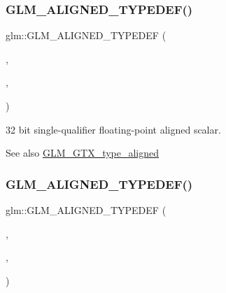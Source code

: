 \subsubsection{\texorpdfstring{G\+L\+M\+\_\+\+A\+L\+I\+G\+N\+E\+D\+\_\+\+T\+Y\+P\+E\+D\+E\+F()}{GLM\_ALIGNED\_TYPEDEF()}\hspace{0.1cm}{\footnotesize\ttfamily [139/209]}}
{\footnotesize\ttfamily glm\+::\+G\+L\+M\+\_\+\+A\+L\+I\+G\+N\+E\+D\+\_\+\+T\+Y\+P\+E\+D\+EF (\begin{DoxyParamCaption}\item[{\hyperlink{group__gtc__type__precision_ga814f2f65354b6588b067cc5c67a6b340}{float32}}]{,  }\item[{aligned\+\_\+f32}]{,  }\item[{4}]{ }\end{DoxyParamCaption})}

32 bit single-\/qualifier floating-\/point aligned scalar. \begin{DoxySeeAlso}{See also}
\hyperlink{group__gtx__type__aligned}{G\+L\+M\+\_\+\+G\+T\+X\+\_\+type\+\_\+aligned} 
\end{DoxySeeAlso}
\mbox{\label{group__gtx__type__aligned_ga75930684ff2233171c573e603f216162}} 
\subsubsection{\texorpdfstring{G\+L\+M\+\_\+\+A\+L\+I\+G\+N\+E\+D\+\_\+\+T\+Y\+P\+E\+D\+E\+F()}{GLM\_ALIGNED\_TYPEDEF()}\hspace{0.1cm}{\footnotesize\ttfamily [140/209]}}
{\footnotesize\ttfamily glm\+::\+G\+L\+M\+\_\+\+A\+L\+I\+G\+N\+E\+D\+\_\+\+T\+Y\+P\+E\+D\+EF (\begin{DoxyParamCaption}\item[{\hyperlink{group__gtc__type__precision_gab721f828b41f46b20cf4883b50733d3b}{float64}}]{,  }\item[{aligned\+\_\+float64}]{,  }\item[{8}]{ }\end{DoxyParamCaption})}

